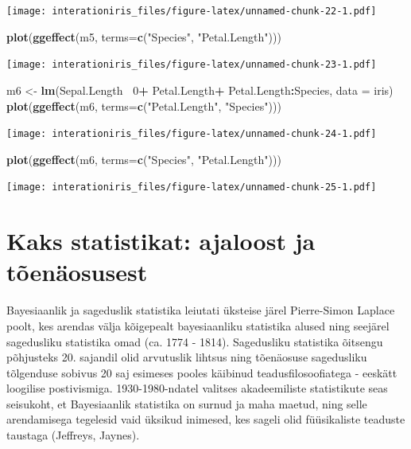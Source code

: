 \documentclass[]{book}
\newenvironment{Shaded}{\begin{snugshade}}{\end{snugshade}}
\newcommand{\KeywordTok}[1]{\textcolor[rgb]{0.13,0.29,0.53}{\textbf{#1}}}
\newcommand{\DataTypeTok}[1]{\textcolor[rgb]{0.13,0.29,0.53}{#1}}
\newcommand{\DecValTok}[1]{\textcolor[rgb]{0.00,0.00,0.81}{#1}}
\newcommand{\StringTok}[1]{\textcolor[rgb]{0.31,0.60,0.02}{#1}}
\newcommand{\OperatorTok}[1]{\textcolor[rgb]{0.81,0.36,0.00}{\textbf{#1}}}
\newcommand{\NormalTok}[1]{#1}
\begin{document}
\texttt{[image: interationiris\_files/figure-latex/unnamed-chunk-22-1.pdf]}

\begin{Shaded}
\begin{Highlighting}[]
\KeywordTok{plot}\NormalTok{(}\KeywordTok{ggeffect}\NormalTok{(m5, }\DataTypeTok{terms=}\KeywordTok{c}\NormalTok{(}\StringTok{"Species"}\NormalTok{, }\StringTok{"Petal.Length"}\NormalTok{)))}
\end{Highlighting}
\end{Shaded}

\texttt{[image: interationiris\_files/figure-latex/unnamed-chunk-23-1.pdf]}

\begin{Shaded}
\begin{Highlighting}[]
\NormalTok{m6 <-}\StringTok{ }\KeywordTok{lm}\NormalTok{(Sepal.Length}\OperatorTok{~}\StringTok{ }\DecValTok{0}\OperatorTok{+}\StringTok{ }\NormalTok{Petal.Length}\OperatorTok{+}\StringTok{ }\NormalTok{Petal.Length}\OperatorTok{:}\NormalTok{Species, }\DataTypeTok{data =}\NormalTok{ iris)}
\KeywordTok{plot}\NormalTok{(}\KeywordTok{ggeffect}\NormalTok{(m6, }\DataTypeTok{terms=}\KeywordTok{c}\NormalTok{(}\StringTok{"Petal.Length"}\NormalTok{, }\StringTok{"Species"}\NormalTok{)))}
\end{Highlighting}
\end{Shaded}

\texttt{[image: interationiris\_files/figure-latex/unnamed-chunk-24-1.pdf]}

\begin{Shaded}
\begin{Highlighting}[]
\KeywordTok{plot}\NormalTok{(}\KeywordTok{ggeffect}\NormalTok{(m6, }\DataTypeTok{terms=}\KeywordTok{c}\NormalTok{(}\StringTok{"Species"}\NormalTok{, }\StringTok{"Petal.Length"}\NormalTok{)))}
\end{Highlighting}
\end{Shaded}

\texttt{[image: interationiris\_files/figure-latex/unnamed-chunk-25-1.pdf]}

\section*{Kaks statistikat: ajaloost ja
tõenäosusest}\label{kaks-statistikat-ajaloost-ja-toenaosusest-1}

Bayesiaanlik ja sageduslik statistika leiutati üksteise järel
Pierre-Simon Laplace poolt, kes arendas välja kõigepealt bayesiaanliku
statistika alused ning seejärel sagedusliku statistika omad (ca. 1774 -
1814). Sagedusliku statistika õitsengu põhjusteks 20. sajandil olid
arvutuslik lihtsus ning tõenäosuse sagedusliku tõlgenduse sobivus 20 saj
esimeses pooles käibinud teadusfilosoofiatega - eeskätt loogilise
postivismiga. 1930-1980-ndatel valitses akadeemiliste statistikute seas
seisukoht, et Bayesiaanlik statistika on surnud ja maha maetud, ning
selle arendamisega tegelesid vaid üksikud inimesed, kes sageli olid
füüsikaliste teaduste taustaga (Jeffreys, Jaynes).
\end{document}
